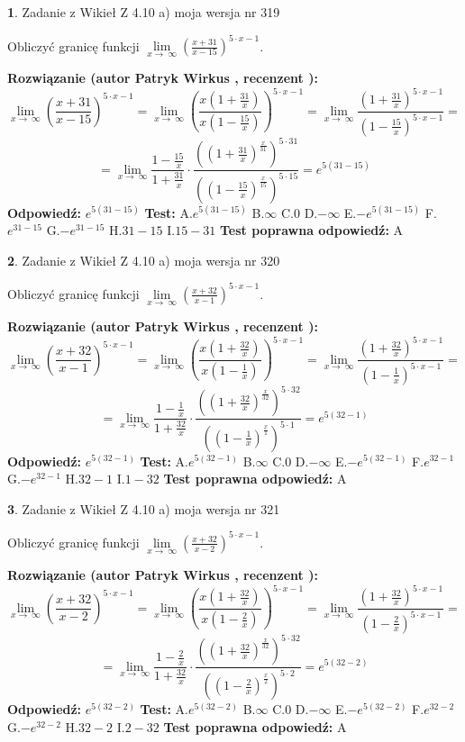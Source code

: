 \documentclass[12pt, a4paper]{article}
\theoremstyle{definition} %
\newtheorem{zad}{}
\newcommand{\zadStart}[1]{\begin{zad}#1\newline}
\newcommand{\zadStop}{\end{zad}}
\newcommand{\rozwStart}[2]{\noindent \textbf{Rozwiązanie (autor #1 , recenzent #2): }\newline}
\newcommand{\rozwStop}{\newline}
\newcommand{\odpStart}{\noindent \textbf{Odpowiedź:}\newline}
\newcommand{\odpStop}{\newline}
\newcommand{\testStart}{\noindent \textbf{Test:}\newline}
\newcommand{\testStop}{\newline}
\newcommand{\kluczStart}{\noindent \textbf{Test poprawna odpowiedź:}\newline}
\newcommand{\kluczStop}{\newline}
\begin{document}
\zadStart{Zadanie z Wikieł Z 4.10 a) moja wersja nr 319}


Obliczyć granicę funkcji  $\lim\limits_{x\to\ \infty}(\frac{x+31}{x-15})^{5\cdot x-1}$.
\zadStop
\rozwStart{Patryk Wirkus}{}
$$\lim\limits_{x\to\ \infty}(\frac{x+31}{x-15})^{5\cdot x-1} = \lim\limits_{x\to\ \infty}(\frac{x(1+\frac{31}{x})}{x(1-\frac{15}{x})})^{5\cdot x-1}=\lim\limits_{x\to\ \infty}\frac{(1+\frac{31}{x})^{5\cdot x-1}}{(1-\frac{15}{x})^{5\cdot x-1}}=$$
$$=\lim\limits_{x\to\ \infty}\frac{1-\frac{15}{x}}{1+\frac{31}{x}}\cdot\frac{((1+\frac{31}{x})^{\frac{x}{31}})^{5\cdot31}}{((1-\frac{15}{x})^{\frac{x}{15}})^{5\cdot15}}=e^{5(31-15)}$$
\rozwStop
\odpStart
$e^{5(31-15)}$
\odpStop
\testStart
A.$e^{5(31-15)}$ B.$\infty$ C.$0$ D.$-\infty$ E.$-e^{5(31-15)}$
F.$e^{31-15}$ G.$-e^{31-15}$
H.$31-15$
I.$15-31$
\testStop
\kluczStart
A
\kluczStop



\zadStart{Zadanie z Wikieł Z 4.10 a) moja wersja nr 320}


Obliczyć granicę funkcji  $\lim\limits_{x\to\ \infty}(\frac{x+32}{x-1})^{5\cdot x-1}$.
\zadStop
\rozwStart{Patryk Wirkus}{}
$$\lim\limits_{x\to\ \infty}(\frac{x+32}{x-1})^{5\cdot x-1} = \lim\limits_{x\to\ \infty}(\frac{x(1+\frac{32}{x})}{x(1-\frac{1}{x})})^{5\cdot x-1}=\lim\limits_{x\to\ \infty}\frac{(1+\frac{32}{x})^{5\cdot x-1}}{(1-\frac{1}{x})^{5\cdot x-1}}=$$
$$=\lim\limits_{x\to\ \infty}\frac{1-\frac{1}{x}}{1+\frac{32}{x}}\cdot\frac{((1+\frac{32}{x})^{\frac{x}{32}})^{5\cdot32}}{((1-\frac{1}{x})^{\frac{x}{1}})^{5\cdot1}}=e^{5(32-1)}$$
\rozwStop
\odpStart
$e^{5(32-1)}$
\odpStop
\testStart
A.$e^{5(32-1)}$ B.$\infty$ C.$0$ D.$-\infty$ E.$-e^{5(32-1)}$
F.$e^{32-1}$ G.$-e^{32-1}$
H.$32-1$
I.$1-32$
\testStop
\kluczStart
A
\kluczStop



\zadStart{Zadanie z Wikieł Z 4.10 a) moja wersja nr 321}


Obliczyć granicę funkcji  $\lim\limits_{x\to\ \infty}(\frac{x+32}{x-2})^{5\cdot x-1}$.
\zadStop
\rozwStart{Patryk Wirkus}{}
$$\lim\limits_{x\to\ \infty}(\frac{x+32}{x-2})^{5\cdot x-1} = \lim\limits_{x\to\ \infty}(\frac{x(1+\frac{32}{x})}{x(1-\frac{2}{x})})^{5\cdot x-1}=\lim\limits_{x\to\ \infty}\frac{(1+\frac{32}{x})^{5\cdot x-1}}{(1-\frac{2}{x})^{5\cdot x-1}}=$$
$$=\lim\limits_{x\to\ \infty}\frac{1-\frac{2}{x}}{1+\frac{32}{x}}\cdot\frac{((1+\frac{32}{x})^{\frac{x}{32}})^{5\cdot32}}{((1-\frac{2}{x})^{\frac{x}{2}})^{5\cdot2}}=e^{5(32-2)}$$
\rozwStop
\odpStart
$e^{5(32-2)}$
\odpStop
\testStart
A.$e^{5(32-2)}$ B.$\infty$ C.$0$ D.$-\infty$ E.$-e^{5(32-2)}$
F.$e^{32-2}$ G.$-e^{32-2}$
H.$32-2$
I.$2-32$
\testStop
\kluczStart
A
\kluczStop
\end{document}
